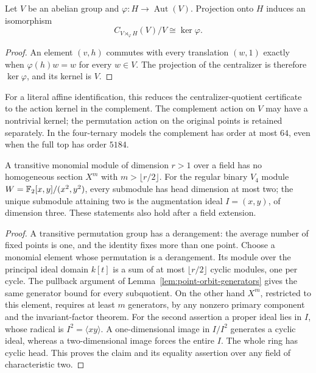\begin{lemma}
\label{lem:affine-translation-centralizer}
Let $V$ be an abelian group and $\varphi:H\to\operatorname{Aut}(V)$.
Projection onto $H$ induces an isomorphism
\[
 C_{V\rtimes_\varphi H}(V)/V\cong\ker\varphi.
\]
\end{lemma}
\begin{proof}
An element $(v,h)$ commutes with every translation $(w,1)$ exactly when
$\varphi(h)w=w$ for every $w\in V$. The projection of the centralizer
is therefore $\ker\varphi$, and its kernel is $V$.
\end{proof}

For a literal affine identification, this reduces the centralizer-quotient
certificate to the action kernel in the complement. The complement action
on $V$ may have a nontrivial kernel; the permutation action on the original
points is retained separately. In the four-ternary models the complement
has order at most $64$, even when the full top has order $5184$.

\begin{lemma}\label{lem:small-monomial}
A transitive monomial module of dimension $r>1$ over a field has no
homogeneous section $X^m$ with $m>\lfloor r/2\rfloor$.
For the regular binary $V_4$ module
$W=\mathbb F_2[x,y]/(x^2,y^2)$, every submodule has head dimension at most two;
the unique submodule attaining two is the augmentation ideal
$I=(x,y)$, of dimension three. These statements also hold after a
field extension.
\end{lemma}
\begin{proof}
A transitive permutation group has a derangement: the average number
of fixed points is one, and the identity fixes more than one point.
Choose a monomial element whose permutation is a derangement. Its
module over the principal ideal domain $k[t]$ is a sum of at most
$\lfloor r/2\rfloor$ cyclic modules, one per cycle. The pullback
argument of Lemma~\ref{lem:point-orbit-generators} gives the same
generator bound for every subquotient. On the other hand $X^m$, restricted
to this element, requires at least $m$ generators, by any nonzero
primary component and the invariant-factor theorem.
For the second assertion a proper ideal lies in $I$, whose radical
is $I^2=\langle xy\rangle$. A one-dimensional image in $I/I^2$
generates a cyclic ideal, whereas a two-dimensional image forces
the entire $I$. The whole ring has cyclic head. This proves the
claim and its equality assertion over any field of characteristic two.
\end{proof}

